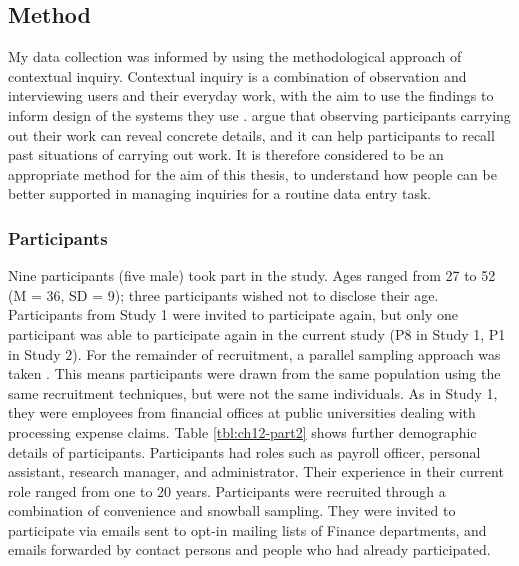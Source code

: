 \subsection{Method}
My data collection was informed by using the methodological approach of contextual inquiry. Contextual inquiry is a combination of observation and interviewing users and their everyday work, with the aim to use the findings to inform design of the systems they use \citep{Holtzblatt2014}.
\citet{Holtzblatt2014} argue that observing participants carrying out their work can reveal concrete details, and it can help participants to recall past situations of carrying out work. It is therefore considered to be an appropriate method for the aim of this thesis, to understand how people can be better supported in managing inquiries for a routine data entry task.

\subsubsection{Participants}
Nine participants (five male) took part in the study. Ages ranged from 27 to 52 (M = 36, SD = 9); three participants wished not to disclose their age. Participants from Study 1 were invited to participate again, but only one participant was able to participate again in the current study (P8 in Study 1, P1 in Study 2).  For the remainder of recruitment, a parallel sampling approach was taken \citep{Onwuegbuzie2008}. This means participants were drawn from the same population using the same recruitment techniques, but were not the same individuals. As in Study 1, they were employees from financial offices at public universities dealing with processing expense claims. Table \ref{tbl:ch12-part2} shows further demographic details of participants. Participants had roles such as payroll officer, personal assistant, research manager, and administrator. Their experience in their current role ranged from one to 20 years. Participants were recruited through a combination of convenience and snowball sampling. They were invited to participate via emails sent to opt-in mailing lists of Finance departments, and emails forwarded by contact persons and people who had already participated.  

